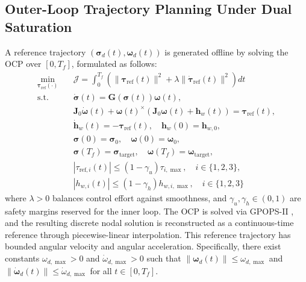\documentclass[journal]{new-aiaa}
\begin{document}
\subsection{Outer-Loop Trajectory Planning Under Dual Saturation}
\label{sec:outer}

A reference trajectory $(\boldsymbol{\sigma}_d(t),\boldsymbol{\omega}_d(t))$ is generated offline by solving the OCP over $[0,T_f]$, formulated as follows:
\begin{equation}
\begin{aligned}
\min_{\boldsymbol{\tau}_{\mathrm{ref}}(\cdot)} \quad &
\mathcal{J} = \int_0^{T_f} \left( \|\boldsymbol{\tau}_{\mathrm{ref}}(t)\|^2
+ \lambda \|\dot{\boldsymbol{\tau}}_{\mathrm{ref}}(t)\|^2 \right) dt \\[2pt]
\mathrm{s.t.}\quad
& \dot{\boldsymbol{\sigma}}(t) = \boldsymbol{G}(\boldsymbol{\sigma}(t)) \boldsymbol{\omega}(t), \\
& \boldsymbol{J}_0 \dot{\boldsymbol{\omega}}(t) + \boldsymbol{\omega}(t)^{\times}\!\left(\boldsymbol{J}_0 \boldsymbol{\omega}(t) + \boldsymbol{h}_w(t)\right) = \boldsymbol{\tau}_{\mathrm{ref}}(t), \\
& \dot{\boldsymbol{h}}_w(t) = -\boldsymbol{\tau}_{\mathrm{ref}}(t), \quad \boldsymbol{h}_w(0) = \boldsymbol{h}_{w,0}, \\[2pt]
& \boldsymbol{\sigma}(0) = \boldsymbol{\sigma}_0, \quad \boldsymbol{\omega}(0) = \boldsymbol{\omega}_0, \\[2pt]
& \boldsymbol{\sigma}(T_f) = \boldsymbol{\sigma}_{\mathrm{target}}, \quad \boldsymbol{\omega}(T_f) = \boldsymbol{\omega}_{\mathrm{target}}, \\[2pt]
& |{\tau}_{\mathrm{ref},i}(t)| \le (1-\gamma_u) \tau_{i,\max}, \quad i \in \{1,2,3\}, \\
& |h_{w,i}(t)| \le (1-\gamma_h) h_{w,i,\max}, \quad i \in \{1,2,3\}
\end{aligned}
\label{eq:OCP_slack}
\end{equation}
where $\lambda>0$ balances control effort against smoothness,
and $\gamma_u,\gamma_h\in(0,1)$ are safety margins reserved for the inner loop.
The OCP is solved via GPOPS-II \cite{patterson_gpops-ii_2014}, and the resulting discrete nodal solution is reconstructed as a continuous-time reference through piecewise-linear interpolation.
This reference trajectory has bounded angular velocity and angular acceleration. Specifically, there exist constants $\omega_{d,\max}>0$ and $\dot{\omega}_{d,\max}>0$ such that
$\|\boldsymbol{\omega}_d(t)\| \le \omega_{d,\max}$ and
$\|\dot{\boldsymbol{\omega}}_d(t)\| \le \dot{\omega}_{d,\max}$ for all $t\in[0,T_f]$.
\end{document}

